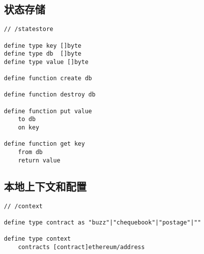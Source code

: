 \subsection{状态存储\statusgreen}\label{spec:format:statestore}
% 

\begin{definition}\label{def:state-store}
\begin{lstlisting}[language=buzz1]
// /statestore

define type key []byte
define type db  []byte
define type value []byte

define function create db

define function destroy db

define function put value
    to db
    on key
    
define function get key 
    from db
    return value
\end{lstlisting}
\end{definition}


\subsection{本地上下文和配置\statusgreen}\label{spec:format:local}
% 


\begin{definition}[Context]\label{def:scontext}
\begin{lstlisting}[language=buzz1]
// /context

define type contract as "buzz"|"chequebook"|"postage"|""

define type context
    contracts [contract]ethereum/address 
\end{lstlisting}
\end{definition}